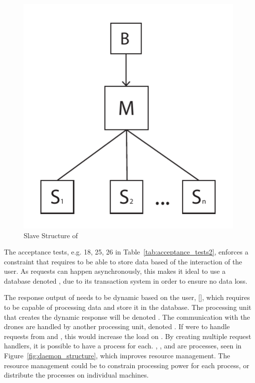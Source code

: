 \begin{figure}[htb]
    \centering
    \includegraphics[width=\textwidth]{gfx/slave_structure.pdf}
    \caption{Slave Structure of \projectname{}}
    \label{fig:slave_structure}
\end{figure}

The acceptance tests, e.g. 18, 25, 26 in Table~\ref{tab:acceptance_tests2}, enforces a constraint that requires  to be able to store data based of the interaction of the user.
As requests can happen asynchronously, this makes it ideal to use a database denoted , due to its transaction system in order to ensure no data loss.

The response output of  needs to be dynamic based on the user, \ref{}, which requires  to be capable of processing data and store it in the database.
The processing unit that creates the dynamic response will be denoted .
The communication with the drones are handled by another processing unit, denoted .
If  were to handle requests from  and , this would increase the load on .
By creating multiple request handlers, it is possible to have a process for each. , , and  are processes, seen in Figure~\ref{fig:daemon_structure}, which improves resource management.
The resource management could be to constrain processing power for each process, or distribute the processes on individual machines.

